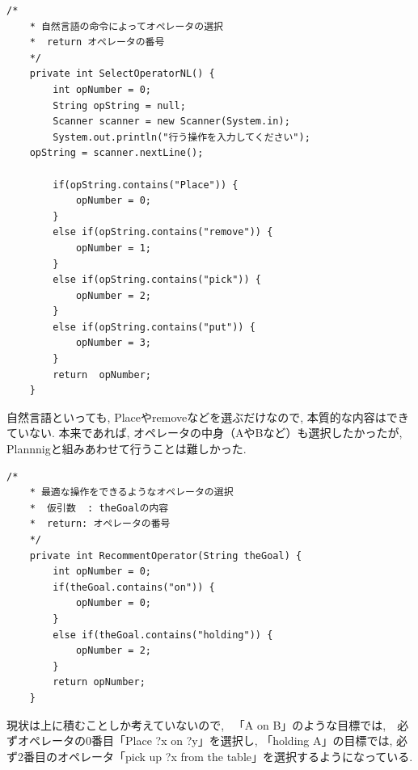 \documentclass[uplatex,12pt]{jsarticle}
\begin{document}
\begin{lstlisting}[caption=推論中におけるオペレータ選択, label=src:No1]
   /*
	* 自然言語の命令によってオペレータの選択
	*  return オペレータの番号
	*/
	private int SelectOperatorNL() {
		int opNumber = 0;
		String opString = null;
		Scanner scanner = new Scanner(System.in);
		System.out.println("行う操作を入力してください");
    opString = scanner.nextLine();
    
		if(opString.contains("Place")) {
			opNumber = 0;
		}
		else if(opString.contains("remove")) {
			opNumber = 1;
		}
		else if(opString.contains("pick")) {
			opNumber = 2;
		}
		else if(opString.contains("put")) {
			opNumber = 3;
		}
	 	return	opNumber;
	}
\end{lstlisting}
自然言語といっても, Placeやremoveなどを選ぶだけなので, 本質的な内容はできていない. 本来であれば, オペレータの中身（AやBなど）も選択したかったが, Plannnigと組みあわせて行うことは難しかった.

\begin{lstlisting}[caption=最適なオペレータ選択, label=src:No1]
     /*
	* 最適な操作をできるようなオペレータの選択
	*  仮引数  : theGoalの内容
	*  return: オペレータの番号
	*/
	private int RecommentOperator(String theGoal) {
		int opNumber = 0;
		if(theGoal.contains("on")) {
			opNumber = 0;
		}
		else if(theGoal.contains("holding")) {
			opNumber = 2;
		}
		return opNumber;
	}
\end{lstlisting}
現状は上に積むことしか考えていないので, 　「A on B」のような目標では,　必ずオペレータの0番目「Place ?x on ?y」を選択し, 「holding A」の目標では, 必ず2番目のオペレータ「pick up ?x from the table」を選択するようになっている.
\end{document}
